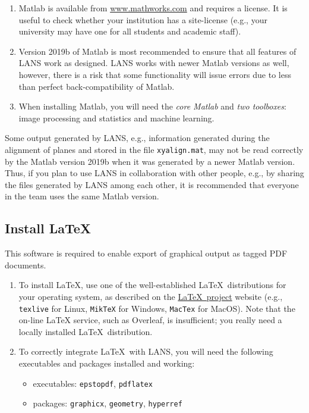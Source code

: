 \documentclass[a4paper, 11pt]{article}
\newcommand{\ttt}[1]{\texttt{#1}}
\newcommand\mnote{\marginnote{\fbox{\textbf{\bf Note}}}}
\begin{document}
\begin{enumerate}

\item Matlab is available from \url{www.mathworks.com} and requires a license. It is useful to check whether your institution has a site-license (e.g., your university may have one for all students and academic staff). 

\item Version 2019b of Matlab is most recommended to ensure that all features of LANS work as designed. LANS works with newer Matlab versions as well, however, there is a risk that some functionality will issue errors due to less than perfect back-compatibility of Matlab.

\item When installing Matlab, you will need the \emph{core Matlab} and \emph{two toolboxes}: image processing and statistics and machine learning. 

\end{enumerate}

\mnote
Some output generated by LANS, e.g., information generated during the alignment of planes and stored in the file \ttt{xyalign.mat}, may not be read correctly by the Matlab version 2019b when it was generated by a newer Matlab version. Thus, if you plan to use LANS in collaboration with other people, e.g., by sharing the files generated by LANS among each other, it is recommended that everyone in the team uses the same Matlab version.


\subsection{Install \LaTeX}

This software is required to enable export of graphical output as tagged PDF documents. 

\begin{enumerate}
 
\item To install \LaTeX, use one of the well-established \LaTeX\ distributions for your operating system, as described on the \href{https://www.latex-project.org/get/}{\LaTeX\ project} website (e.g., \ttt{texlive} for Linux, \ttt{MikTeX} for Windows, \ttt{MacTex} for MacOS). Note that the on-line LaTeX service, such as Overleaf, is insufficient; you really need a locally installed \LaTeX\ distribution.
 
\item To correctly integrate \LaTeX\ with LANS, you will need the following executables and packages installed and working:
 
\begin{itemize}
\item executables: \ttt{epstopdf}, \ttt{pdflatex}
\item packages: \ttt{graphicx}, \ttt{geometry}, \ttt{hyperref}
\end{itemize}
 
\end{enumerate}
 
\end{document}

